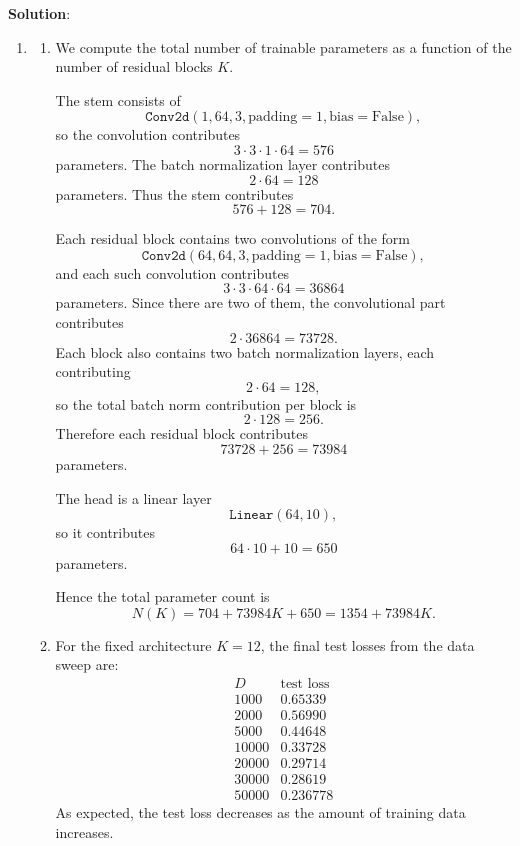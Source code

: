 \documentclass[submit]{harvardml}
\newenvironment{solution}{
    \vspace{2mm}
    \color{blue}\noindent\textbf{Solution}:
}{}
\begin{document}
\begin{solution}
\begin{enumerate}
    \item[(a)] 
    \begin{enumerate}
        \item We compute the total number of trainable parameters as a function of the number of residual blocks $K$.

        The stem consists of
        \[
        \texttt{Conv2d}(1,64,3,\text{padding}=1,\text{bias}=\text{False}),
        \]
        so the convolution contributes
        \[
        3 \cdot 3 \cdot 1 \cdot 64 = 576
        \]
        parameters. The batch normalization layer contributes
        \[
        2 \cdot 64 = 128
        \]
        parameters. Thus the stem contributes
        \[
        576 + 128 = 704.
        \]

        Each residual block contains two convolutions of the form
        \[
        \texttt{Conv2d}(64,64,3,\text{padding}=1,\text{bias}=\text{False}),
        \]
        and each such convolution contributes
        \[
        3 \cdot 3 \cdot 64 \cdot 64 = 36864
        \]
        parameters. Since there are two of them, the convolutional part contributes
        \[
        2 \cdot 36864 = 73728.
        \]
        Each block also contains two batch normalization layers, each contributing
        \[
        2 \cdot 64 = 128,
        \]
        so the total batch norm contribution per block is
        \[
        2 \cdot 128 = 256.
        \]
        Therefore each residual block contributes
        \[
        73728 + 256 = 73984
        \]
        parameters.

        The head is a linear layer
        \[
        \texttt{Linear}(64,10),
        \]
        so it contributes
        \[
        64 \cdot 10 + 10 = 650
        \]
        parameters.

        Hence the total parameter count is
        \[
        N(K) = 704 + 73984K + 650 = 1354 + 73984K.
        \]

        \item For the fixed architecture $K=12$, the final test losses from the data sweep are:
        \[
        \begin{array}{c|c}
        D & \text{test loss} \\ \hline
        1000 & 0.65339 \\
        2000 & 0.56990 \\
        5000 & 0.44648 \\
        10000 & 0.33728 \\
        20000 & 0.29714 \\
        30000 & 0.28619 \\
        50000 & 0.236778
        \end{array}
        \]
        As expected, the test loss decreases as the amount of training data increases.


\end{enumerate}
\end{enumerate}
\end{solution}
\end{document}
